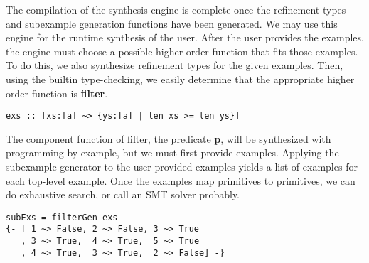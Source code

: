 
The compilation of the synthesis engine is complete once the refinement types and subexample generation functions have been generated.
We may use this engine for the runtime synthesis of the user.
After the user provides the examples, the engine must choose a possible higher order function that fits those examples.
To do this, we also synthesize refinement types for the given examples.
Then, using the builtin type-checking, we easily determine that the appropriate higher order function is \textbf{filter}.

\begin{verbatim}
exs :: [xs:[a] ~> {ys:[a] | len xs >= len ys}]
\end{verbatim}

The component function of filter, the predicate \textbf{p}, will be synthesized with programming by example, but we must first provide examples. 
Applying the subexample generator to the user provided examples yields a list of examples for each top-level example.
Once the examples map primitives to primitives, we can do exhaustive search, or call an SMT solver probably.

\begin{verbatim}
subExs = filterGen exs
{- [ 1 ~> False, 2 ~> False, 3 ~> True
   , 3 ~> True,  4 ~> True,  5 ~> True
   , 4 ~> True,  3 ~> True,  2 ~> False] -}
\end{verbatim}

